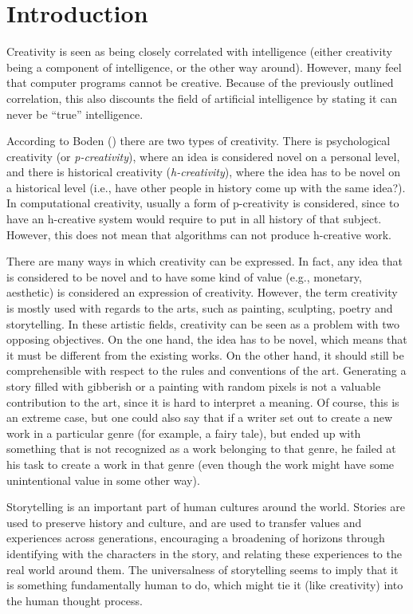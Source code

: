 \section{Introduction}

Creativity is seen as being closely correlated with intelligence (either
creativity being a component of intelligence, or the other way around).
However, many feel that computer programs cannot be creative. Because of the
previously outlined correlation, this also discounts the field of artificial
intelligence by stating it can never be ``true'' intelligence.

According to Boden (\cite{Boden1998347})
there are two types of creativity. There is psychological creativity (or
\emph{p-creativity}), where an idea is considered novel on a personal level, and
there is historical creativity (\emph{h-creativity}), where the idea has to be
novel on a historical level (i.e., have other people in history come up with the
same idea?).
In computational creativity, usually a form of p-creativity is considered, since
to have an h-creative system would require to put in all history of that
subject. However, this does not mean that algorithms can not produce h-creative
work.

There are many ways in which creativity can be expressed. In fact, any idea that
is considered to be novel and to have some kind of value (e.g., monetary, aesthetic) is
considered an expression of creativity. However, the term creativity is mostly used with regards to
the arts, such as painting, sculpting, poetry and storytelling. In these
artistic fields, creativity can be seen as a problem with two opposing
objectives. On the one hand, the idea has to be novel, which means that it must be different from
the existing works. On the other hand, it should still be comprehensible with
respect to the rules and conventions of the art. Generating a story filled with
gibberish or a painting with random pixels is not a valuable contribution to the
art, since it is hard to interpret a meaning. Of course, this is an extreme
case, but one could also say that if a writer set out to create a new work in a
particular genre (for example, a fairy tale), but ended up with something that
is not recognized as a work belonging to that genre, he failed at his task to
create a work in that genre (even though the work might have some unintentional
value in some other way).

Storytelling is an important part of human cultures around the world.
Stories are used to preserve history and culture, and are used to transfer values
and experiences across generations, encouraging a broadening of horizons through
identifying with the characters in the story, and relating these experiences to
the real world around them. The universalness of storytelling seems to imply
that it is something fundamentally human to do, which might tie it (like
creativity) into the human thought process.

